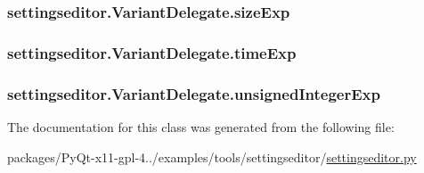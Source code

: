 \subsubsection[{size\+Exp}]{\setlength{\rightskip}{0pt plus 5cm}settingseditor.\+Variant\+Delegate.\+size\+Exp}\label{classsettingseditor_1_1VariantDelegate_a264f15b067307607fb008c14168736fd}
\hypertarget{classsettingseditor_1_1VariantDelegate_a6a8e24c1509a9f03462602efc4456a81}{}
\subsubsection[{time\+Exp}]{\setlength{\rightskip}{0pt plus 5cm}settingseditor.\+Variant\+Delegate.\+time\+Exp}\label{classsettingseditor_1_1VariantDelegate_a6a8e24c1509a9f03462602efc4456a81}
\hypertarget{classsettingseditor_1_1VariantDelegate_ab76abc86170c0ff9342b64506a17d667}{}
\subsubsection[{unsigned\+Integer\+Exp}]{\setlength{\rightskip}{0pt plus 5cm}settingseditor.\+Variant\+Delegate.\+unsigned\+Integer\+Exp}\label{classsettingseditor_1_1VariantDelegate_ab76abc86170c0ff9342b64506a17d667}


The documentation for this class was generated from the following file\+:\begin{DoxyCompactItemize}
\item 
packages/\+Py\+Qt-\/x11-\/gpl-\/4../examples/tools/settingseditor/\hyperlink{settingseditor_8py}{settingseditor.\+py}\end{DoxyCompactItemize}

